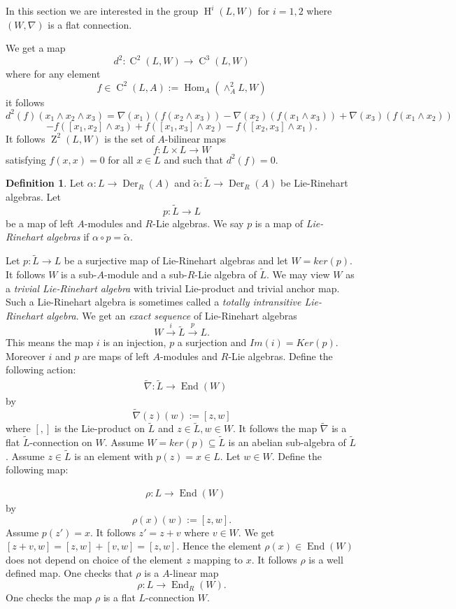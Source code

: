 \documentclass{amsart}
\theoremstyle{plain}
\theoremstyle{definition}
\newtheorem{definition}[theorem]{Definition}
\theoremstyle{remark}
\numberwithin{equation}{theorem}
\begin{document}
In this section we are interested in the group ${\operatorname{H} }^i(L,W)$ for $i=1,2$ where $(W,\nabla)$ is a flat connection. 

We get a map
\[ d^2:{\operatorname{C} }^2(L,W)\rightarrow {\operatorname{C} }^3(L,W)\]
where for any element
\[ f\in {\operatorname{C} }^2(L,A):={\operatorname{Hom} }_{A}(\wedge^2_{A} L,W) \]
it follows 
\[d^2(f)(x_1 \wedge x_2 \wedge x_3)=\nabla(x_1)(f(x_2\wedge x_3))-\nabla(x_2)(f(x_1\wedge x_3)) 
+\nabla(x_3)(f(x_1 \wedge x_2)) \]
\[ -f([x_1,x_2]\wedge x_3)+f([x_1,x_3]\wedge x_2)-f([x_2,x_3]\wedge x_1). \]
It follows ${\operatorname{Z}}^2(L,W)$ is the set of ${A}$-bilinear maps
\[ f:L\times L \rightarrow W \]
satisfying $f(x,x)=0$ for all $x\in L$ and such that $d^2(f)=0$. 

\begin{definition}
Let $\alpha:L\rightarrow {\operatorname{Der} }_{R}({A})$ and $\tilde{\alpha}:\tilde{L}\rightarrow {\operatorname{Der} }_{R}({A})$
be Lie-Rinehart algebras. 
Let
\[ p:\tilde{L}\rightarrow L \]
be a map of left ${A}$-modules and ${R}$-Lie algebras.
We say $p$ is a map of \emph{Lie-Rinehart algebras} if $\alpha \circ p =\tilde{\alpha}$.
\end{definition}

Let $p:\tilde{L} \rightarrow L$ be a surjective map of Lie-Rinehart algebras and let $W=ker(p)$. It follows $W$ is a
sub-${A}$-module and a sub-${R}$-Lie algebra of $\tilde{L}$. We may view $W$ as a \emph{trivial Lie-Rinehart algebra}
with trivial Lie-product and trivial anchor map. Such a Lie-Rinehart algebra is sometimes called a
\emph{totally intransitive Lie-Rinehart algebra}.
We get an \emph{exact sequence} of Lie-Rinehart algebras 
\[ W \xrightarrow{i} \tilde{L}\xrightarrow{p} L  .\]
This means the map $i$ is an injection, $p$ a surjection and $Im(i)=Ker(p)$.
Moreover $i$ and $p$ are maps of left ${A}$-modules and ${R}$-Lie algebras.
Define the following action:
\begin{align} 
&\label{flat} \tilde{\nabla}:\tilde{L}\rightarrow {\operatorname{End} }(W) 
\end{align}
by
\[ \tilde{\nabla}(z)(w):=[z,w]\]
where $[,]$ is the Lie-product on $\tilde{L}$ and $z\in \tilde{L}, w\in W$.
It follows  the map $\tilde{\nabla}$ is a flat $\tilde{L}$-connection on $W$.
Assume $W=ker(p) \subseteq \tilde{L}$ is an abelian sub-algebra of $\tilde{L}$. 
Assume $z\in \tilde{L}$ is an element with $p(z)=x\in L$. Let $w\in W$. Define the following map:

\begin{align}
&\label{flat2} \rho:L\rightarrow {\operatorname{End} }(W) 
\end{align}
by
\[ \rho(x)(w):=[z,w].\]
Assume $p(z')=x$. It follows $z'=z+v$ where $v\in W$. We get $[z+v,w]=[z,w]+[v,w]=[z,w]$. Hence the 
element $\rho(x)\in {\operatorname{End} }(W)$ does not depend on choice of the element $z$ mapping to $x$. It follows $\rho$ is a well
defined map. One checks that $\rho$ is a ${A}$-linear map
\[ \rho:L\rightarrow {\operatorname{End} }_{R}(W).\]
One checks the map $\rho$ is a flat $L$-connection $W$.
\end{document}

